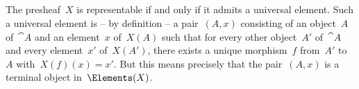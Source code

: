 \subsection{}

The presheaf~$X$ is representable if and only if it admits a universal element.
Such a universal element is -- by definition -- a pair~$(A, x)$ consisting of an object~$A$ of~$\cat{A}$ and an element~$x$ of~$X(A)$ such that for every other object~$A'$ of~$\cat{A}$ and every element~$x'$ of~$X(A')$, there exists a unique morphism~$f$ from~$A'$ to~$A$ with~$X(f)(x) = x'$.
But this means precisely that the pair~$(A, x)$ is a terminal object in~$\Elements(X)$.
